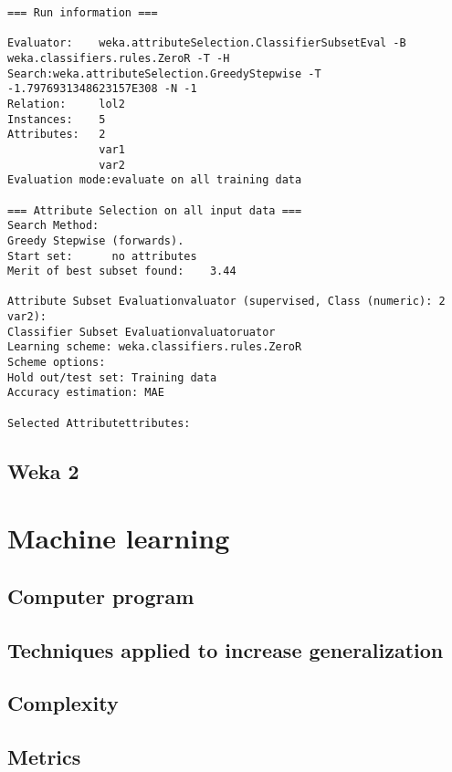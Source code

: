 \documentclass[a4paper,12pt,pdftex]{article}
\begin{document}
\begin{lstlisting}[frame=single]
=== Run information ===

Evaluator:    weka.attributeSelection.ClassifierSubsetEval -B weka.classifiers.rules.ZeroR -T -H
Search:weka.attributeSelection.GreedyStepwise -T -1.7976931348623157E308 -N -1
Relation:     lol2
Instances:    5
Attributes:   2
              var1
              var2
Evaluation mode:evaluate on all training data

=== Attribute Selection on all input data ===
Search Method:
Greedy Stepwise (forwards).
Start set:      no attributes
Merit of best subset found:    3.44 

Attribute Subset Evaluationvaluator (supervised, Class (numeric): 2 var2):
Classifier Subset Evaluationvaluatoruator
Learning scheme: weka.classifiers.rules.ZeroR
Scheme options: 
Hold out/test set: Training data
Accuracy estimation: MAE

Selected Attributettributes: 

\end{lstlisting}

\subsection{Weka 2}
\section{Machine learning}
\subsection{Computer program}
\subsection{Techniques applied to increase generalization}
\subsection{Complexity}
\subsection{Metrics}

\nocite{*}


\end{document}

